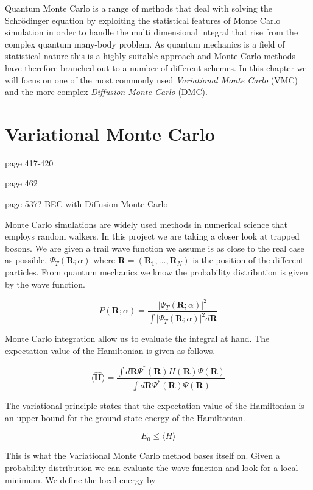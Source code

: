 Quantum Monte Carlo is a range of methods that deal with solving the Schrödinger equation by exploiting the statistical features of Monte Carlo simulation in order to handle the multi dimensional integral that rise from the complex quantum many-body problem. As quantum mechanics is a field of statistical nature this is a highly suitable approach and Monte Carlo methods have therefore branched out to a number of different schemes. In this chapter we will focus on one of the most commonly used \textit{Variational Monte Carlo} (VMC) and the more complex \textit{Diffusion Monte Carlo} (DMC).

\section{Variational Monte Carlo}

\cite{hjorthjensen}
page 417-420

page 462

page 537? BEC with Diffusion Monte Carlo

Monte Carlo simulations are widely used methods in numerical science that employs random walkers. 
In this project we are taking a closer look at trapped bosons. We are given a trail wave function we assume is as close to the real case as possible, $\Psi_T(\mathbf{R};\alpha)$ where $\mathbf{R} = (\mathbf{R}_1, ... , \mathbf{R}_N)$ is the position of the different particles. 
From quantum mechanics we know the probability distribution is given by the wave function. 

\begin{equation} \label{eq:prob_dist}
P(\mathbf{R}; \alpha) = \frac{|\Psi_T(\mathbf{R};\alpha)|^2}{\int|\Psi_T(\mathbf{R};\alpha)|^2 d\mathbf{R}}
\end{equation} 

Monte Carlo integration allow us to evaluate the integral at hand. The expectation value of the Hamiltonian is given as follows. 

$$\langle \widehat{\mathbf{H}}\rangle = \frac{\int d \mathbf{R} \Psi^{\ast} (\mathbf{R})H(\mathbf{R}) \Psi(\mathbf{R})}{\int d \mathbf{R} \Psi^{\ast} (\mathbf{R}) \Psi(\mathbf{R})}$$

The variational principle states that the expectation value of the Hamiltonian is an upper-bound for the ground state energy of the Hamiltonian.

$$E_0 \leq \langle H \rangle$$

This is what the Variational Monte Carlo method bases itself on. Given a probability distribution we can evaluate the wave function and look for a local minimum. We define the local energy by

